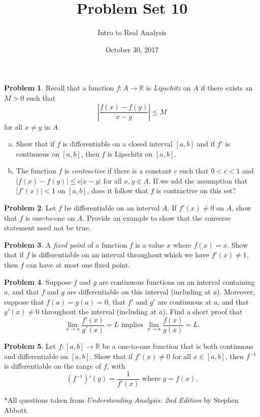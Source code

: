 \documentclass{amsart}
\newcommand{\+}[1]{\ensuremath{\mathbf{#1}}}
\newcommand{\R}{{\mathbb R}}
\theoremstyle{definition}
\newtheorem{prob}{Problem}
\begin{document}
\title{Problem Set 10}
\date{October 30, 2017}
\author{Intro to Real Analysis}

\maketitle

\begin{prob}
 Recall that a function $f: A \to \R$ is \emph{Lipschitz} on $A$
 if there exists an $M > 0$ such that
 \[
 \left| \frac{f(x) - f(y)}{x-y} \right| \leq M
 \]
 for all $x \neq y$ in $A$.
 \begin{enumerate}[(a)]
  \item  Show that if $f$ is differentiable on a closed interval $[a,b]$
  and if $f'$ is continuous on $[a,b]$, then $f$ is Lipschitz on $[a,b]$.
  \item  The function $f$ is \emph{contractive} if there is a constant $c$
  such that $0<c<1$ and
  $|f(x) - f(y)| \leq c|x-y|$ for all $x,y \in A$.
  If we add the assumption that $|f'(x)| < 1$ on $[a,b]$, does
  it follow that $f$ is contractive on this set?
 \end{enumerate}
\end{prob}


\begin{prob}
 Let $f$ be differentiable on an interval $A$.  If $f'(x) \neq 0$ on $A$,
 show that $f$ is one-to-one on $A$.
 Provide an example to show that the converse statement need not be true.
\end{prob}

\begin{prob}
 A \emph{fixed point} of a function $f$ is a value $x$ where $f(x) = x$.
 Show that if $f$ is differentiable on an interval throughout which we have $f'(x) \neq 1$,
 then $f$ can have at most one fixed point.
\end{prob}

\begin{prob}
 Suppose $f$ and $g$ are continuous functions on an interval containing $a$,
 and that  $f$ and
 $g$ are differentiable on this interval (including at $a$). 
 Moreover, suppose that $f(a) = g(a) = 0$, that $f'$ and $g'$ are continuous at $a$,
 and that $g'(x) \neq 0$ throughout the interval (including at $a$).
 Find a short proof that
 \[
\lim_{x \to a} \frac{f'(x)}{g'(x)} = L \text{ implies } \lim_{x \to a} \frac{f(x)}{g(x)} = L.
 \]
 \end{prob}


\begin{prob}
Let $f: [a,b] \to \R$ be a one-to-one function that is both continuous and differentiable
on $[a,b]$.
Show that if $f'(x) \neq 0$ for all $x \in [a,b]$, then $f^{-1}$
is differentiable on the range of $f$, with
\[(f^{-1})'(y) = \frac{1}{f'(x)} \text{ where } y=f(x).\]
\end{prob}


\vspace{5mm}

*All questions taken from \emph{Understanding Analysis: 2nd Edition} by Stephen Abbott.
\end{document}
